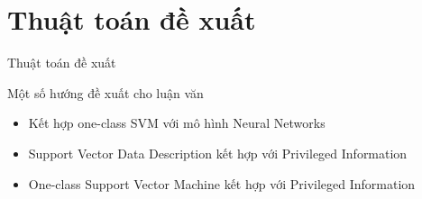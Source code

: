 \documentclass[
	10pt,                %
	aspectratio=169,     %
]{beamer}
\begin{document}
\section{Thuật toán đề xuất}
	\begin{frame}{Thuật toán đề xuất}
        \begin{block}{Một số hướng đề xuất cho luận văn}
    	\begin{itemize}
            \item  Kết hợp one-class SVM với mô hình Neural Networks
            \item Support Vector Data Description kết hợp với Privileged Information
            \item One-class Support Vector Machine kết hợp với Privileged Information
           
    	\end{itemize}
        \end{block}
    \end{frame}	
	
    
	
\end{document}
